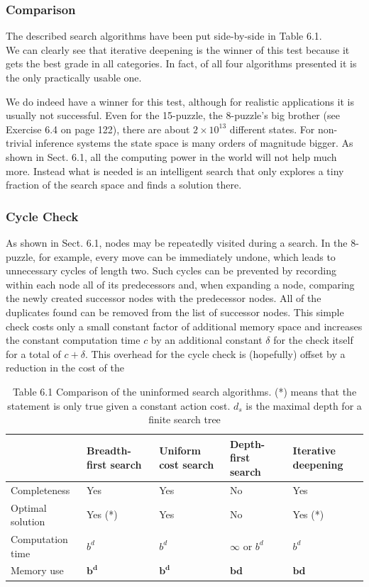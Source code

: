\documentclass[10pt]{article}
\begin{document}
\subsubsection*{Comparison}
The described search algorithms have been put side-by-side in Table 6.1.\\
We can clearly see that iterative deepening is the winner of this test because it gets the best grade in all categories. In fact, of all four algorithms presented it is the only practically usable one.

We do indeed have a winner for this test, although for realistic applications it is usually not successful. Even for the 15-puzzle, the 8-puzzle's big brother (see Exercise 6.4 on page 122), there are about $2 \times 10^{13}$ different states. For non-trivial inference systems the state space is many orders of magnitude bigger. As shown in Sect. 6.1, all the computing power in the world will not help much more. Instead what is needed is an intelligent search that only explores a tiny fraction of the search space and finds a solution there.

\subsubsection*{Cycle Check}
As shown in Sect. 6.1, nodes may be repeatedly visited during a search. In the 8-puzzle, for example, every move can be immediately undone, which leads to unnecessary cycles of length two. Such cycles can be prevented by recording within each node all of its predecessors and, when expanding a node, comparing the newly created successor nodes with the predecessor nodes. All of the duplicates found can be removed from the list of successor nodes. This simple check costs only a small constant factor of additional memory space and increases the constant computation time $c$ by an additional constant $\delta$ for the check itself for a total of $c+\delta$. This overhead for the cycle check is (hopefully) offset by a reduction in the cost of the

\begin{table}[h]
\begin{center}
\captionsetup{labelformat=empty}
\caption{Table 6.1 Comparison of the uninformed search algorithms. (*) means that the statement is only true given a constant action cost. $d_{s}$ is the maximal depth for a finite search tree}
\begin{tabular}{|l|l|l|l|l|}
\hline
 & Breadth-first search & Uniform cost search & Depth-first search & Iterative deepening \\
\hline
Completeness & Yes & Yes & No & Yes \\
\hline
Optimal solution & Yes (*) & Yes & No & Yes (*) \\
\hline
Computation time & $b^{d}$ & $b^{d}$ & $\infty$ or $b^{d}$ & $b^{d}$ \\
\hline
Memory use & $\boldsymbol{b}^{\boldsymbol{d}}$ & $\boldsymbol{b}^{\boldsymbol{d}}$ & $\boldsymbol{b} \boldsymbol{d}$ & $\boldsymbol{b} \boldsymbol{d}$ \\
\hline
\end{tabular}
\end{center}
\end{table}
\end{document}
